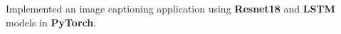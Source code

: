\item{Implemented an image captioning application using \textbf{Resnet18} and \textbf{LSTM} models in \textbf{PyTorch}.}

